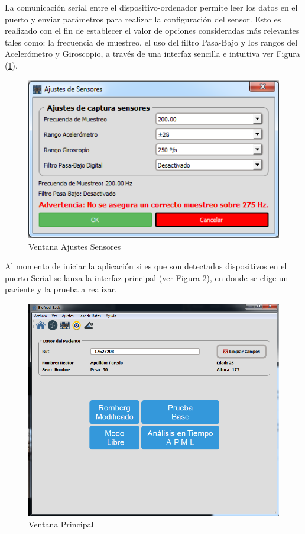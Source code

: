 \documentclass[12pt,a4paper]{article}
\begin{document}
La comunicación serial entre el dispositivo-ordenador permite leer los datos en el puerto y enviar parámetros para realizar la configuración del sensor.
Esto es realizado con el fin de establecer el valor de opciones consideradas más relevantes tales como: la frecuencia de muestreo, el uso del filtro Pasa-Bajo y los rangos del Acelerómetro y Giroscopio, a través de una interfaz sencilla e intuitiva ver Figura (\ref{fig:ajustessensores}).

\begin{figure}[H]
	\centering
	\includegraphics[scale=0.6]{images/ajustesSensores}
	\caption{Ventana Ajustes Sensores}
	\label{fig:ajustessensores}
\end{figure}

\newpage
Al momento de iniciar la aplicación si es que son detectados dispositivos en el puerto Serial se lanza la interfaz principal (ver Figura \ref{fig:mainwindow}), en donde se elige un paciente y la prueba a realizar.

\begin{figure}[H]
	\centering
	\includegraphics[scale=0.6]{images/mainwindow}
	\caption{Ventana Principal}
	\label{fig:mainwindow}
\end{figure}
\end{document}
